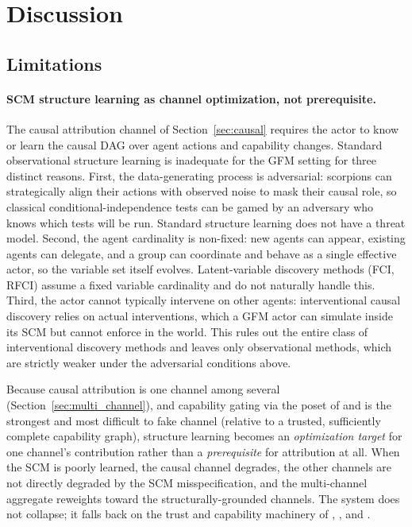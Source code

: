 \section{Discussion}
\label{sec:discussion}

\subsection{Limitations}

\paragraph{SCM structure learning as channel optimization, not
prerequisite.} The causal attribution channel of
Section~\ref{sec:causal} requires the actor to know or learn the
causal DAG over agent actions and capability changes. Standard
observational structure learning \citep{spirtes2000causation} is
inadequate for the GFM setting for three distinct reasons. First,
the data-generating process is adversarial: scorpions can
strategically align their actions with observed noise to mask their
causal role, so classical conditional-independence tests can be
gamed by an adversary who knows which tests will be run. Standard
structure learning does not have a threat model. Second, the agent
cardinality is non-fixed: new agents can appear, existing agents can
delegate, and a group can coordinate and behave as a single
effective actor, so the variable set itself evolves. Latent-variable
discovery methods (FCI, RFCI) assume a fixed variable cardinality
and do not naturally handle this. Third, the actor cannot typically
intervene on other agents: interventional causal discovery relies on
actual interventions, which a GFM actor can simulate inside its SCM
but cannot enforce in the world. This rules out the entire class of
interventional discovery methods and leaves only observational
methods, which are strictly weaker under the adversarial conditions
above.

Because causal attribution is one channel among several
(Section~\ref{sec:multi_channel}), and capability gating via the
poset of \citet{lasser2026poset} and \citet{lasser2026horizon} is
the strongest and most difficult to fake channel (relative to a
trusted, sufficiently complete capability graph), structure learning
becomes an \emph{optimization target} for one channel's contribution
rather than a \emph{prerequisite} for attribution at all. When the
SCM is poorly learned, the causal channel degrades, the other
channels are not directly degraded by the SCM misspecification, and
the multi-channel aggregate reweights toward the
structurally-grounded channels. The system does not collapse; it
falls back on the trust and capability machinery of
\citet{lasser2026gfm}, \citet{lasser2026poset}, and
\citet{lasser2026horizon}.

